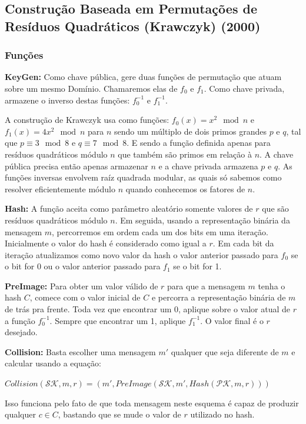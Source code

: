\documentclass[a4paper]{article}
\begin{document}
\subsection{Construção Baseada em Permutações de Resíduos Qua\-drá\-ti\-cos
  (Krawczyk) (2000) \cite{krawczyk}}

\subsubsection{Funções}

\textbf{KeyGen: }Como chave pública, gere duas funções de permutação
que atuam sobre um mesmo Domínio. Chamaremos elas de $f_0$ e
$f_1$. Como chave privada, armazene o inverso destas funções:
$f_0^{-1}$ e $f_1^{-1}$.

A construção de Krawczyk usa como funções: $f_0(x) = x^2 \mod n$ e
$f_1(x) = 4x^2 \mod n$ para $n$ sendo um múltiplo de dois primos
grandes $p$ e $q$, tal que $p \equiv 3 \mod 8$ e $q \equiv 7 \mod
8$. E sendo a função definida apenas para resíduos quadráticos módulo
$n$ que também são primos em relação à $n$. A chave pública precisa
então apenas armazenar $n$ e a chave privada armazena $p$ e $q$. As
funções inversas envolvem raíz quadrada modular, as quais só sabemos
como resolver eficientemente módulo $n$ quando conhecemos os fatores
de $n$.

\textbf{Hash:} A função aceita como parâmetro aleatório somente
valores de $r$ que são resíduos quadráticos módulo $n$. Em seguida,
usando a representação binária da mensagem $m$, percorremos em ordem
cada um dos bits em uma iteração. Inicialmente o valor do hash é
considerado como igual a $r$. Em cada bit da iteração atualizamos como
novo valor da hash o valor anterior passado para $f_0$ se o bit for 0
ou o valor anterior passado para $f_1$ se o bit for 1.

\textbf{PreImage:} Para obter um valor válido de $r$ para que a
mensagem $m$ tenha o hash $C$, comece com o valor inicial de $C$ e
percorra a representação binária de $m$ de trás pra frente. Toda vez
que encontrar um 0, aplique sobre o valor atual de $r$ a função
$f_0^{-1}$. Sempre que encontrar um 1, aplique $f_1^{-1}$. O valor
final é o $r$ desejado.

\textbf{Collision:} Basta escolher uma mensagem $m'$ qualquer que seja
diferente de $m$ e calcular usando a equação:

$Collision(\mathcal{SK}, m, r) = (m', PreImage(\mathcal{SK}, m',
Hash(\mathcal{PK}, m, r)))$

Isso funciona pelo fato de que toda mensagem neste esquema é capaz de
produzir qualquer $c \in C$, bastando que se mude o valor de $r$
utilizado no hash.
\end{document}
